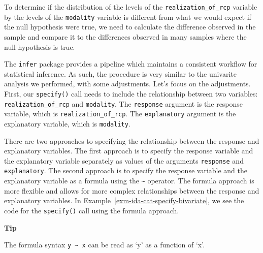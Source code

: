 \documentclass[
  letterpaper,
  DIV=11,
  numbers=noendperiod]{scrreprt}
\theoremstyle{definition}
\theoremstyle{remark}
\begin{document}
To determine if the distribution of the levels of the
\texttt{realization\_of\_rcp} variable by the levels of the
\texttt{modality} variable is different from what we would expect if the
null hypothesis were true, we need to calculate the difference observed
in the sample and compare it to the differences observed in many samples
where the null hypothesis is true.

The \texttt{infer} package provides a pipeline which maintains a
consistent workflow for statistical inference. As such, the procedure is
very similar to the univarite analysis we performed, with some
adjustments. Let's focus on the adjustments. First, our
\texttt{specify()} call needs to include the relationship between two
variables: \texttt{realization\_of\_rcp} and \texttt{modality}. The
\texttt{response} argument is the response variable, which is
\texttt{realization\_of\_rcp}. The \texttt{explanatory} argument is the
explanatory variable, which is \texttt{modality}.

There are two approaches to specifying the relationship between the
response and explanatory variables. The first approach is to specify the
response variable and the explanatory variable separately as values of
the arguments \texttt{response} and \texttt{explanatory}. The second
approach is to specify the response variable and the explanatory
variable as a formula using the \texttt{\textasciitilde{}} operator. The
formula approach is more flexible and allows for more complex
relationships between the response and explanatory variables. In
Example~\ref{exm-ida-cat-specify-bivariate}, we see the code for the
\texttt{specify()} call using the formula approach.

\begin{tcolorbox}[enhanced jigsaw, leftrule=.75mm, colframe=quarto-callout-color-frame, colback=white, rightrule=.15mm, opacityback=0, arc=.35mm, breakable, bottomrule=.15mm, left=2mm, toprule=.15mm]

\textbf{ Tip}

The formula syntax \texttt{y\ \textasciitilde{}\ x} can be read as `y'
as a function of `x'.

\end{tcolorbox}
\end{document}
